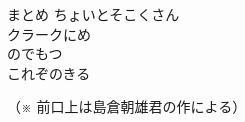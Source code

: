 \documentclass[10pt,b5j]{tarticle} %
\begin{document}
\begin{enumerate}
\begin{minipage}[c]{\blocksize}
    \end{minipage}
    \begin{minipage}[c]{\blocksize}

        \vspace{\linespace}
        \item [まとめ]
        ちょいとそこくさん\\
        クラークにめ\\
        のでもつ\\
        これぞのきる
    
    \end{minipage}
\end{enumerate} %

\begin{flushright}
    （※ 前口上は島倉朝雄君の作による）
\end{flushright}

\end{document}
